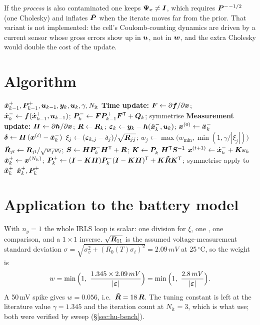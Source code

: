 If the \emph{process} is also contaminated one keeps $\bm\Psi_x\ne\bm{I}$, which requires
$\bm{P}^{-}{}^{-1/2}$ (one Cholesky) and inflates $\tilde{\bm{P}}$ when the iterate moves far from the
prior.  That variant is not implemented: the cell's Coulomb-counting dynamics are driven by a
current sensor whose gross errors show up in $\bm{u}$, not in $\bm{w}$, and the extra Cholesky would
double the cost of the update.

\section{Algorithm}
\begin{algorithm}[H]
\caption{Huber-EKF --- one sampling period}
\begin{algorithmic}[1]
\Require $\hat{\bm{x}}^{+}_{k-1},\bm{P}^{+}_{k-1},\bm{u}_{k-1},\bm{y}_k,\bm{u}_k,\gamma,N_{\mathrm{it}}$
\State \textbf{Time update:} $\bm{F}\gets\partial\bm{f}/\partial\bm{x}$;\;
  $\hat{\bm{x}}^{-}_k\gets\bm{f}(\hat{\bm{x}}^{+}_{k-1},\bm{u}_{k-1})$;\;
  $\bm{P}^{-}_k\gets\bm{F}\bm{P}^{+}_{k-1}\bm{F}^{\mathsf{T}}+\bm{Q}_k$; symmetrise
\State \textbf{Measurement update:} $\bm{H}\gets\partial\bm{h}/\partial\bm{x}$;\; $\bm{R}\gets\bm{R}_k$;\;
  $\bm{\varepsilon}_k\gets\bm{y}_k-\bm{h}(\hat{\bm{x}}^{-}_k,\bm{u}_k)$;\; $\bm{x}^{(0)}\gets\hat{\bm{x}}^{-}_k$
 
  \State $\bm\delta \gets \bm{H}\,(\bm{x}^{(t)}-\hat{\bm{x}}^{-}_k)$
    \State $\xi_j\gets(\bm{\varepsilon}_{k,j}-\delta_j)/\sqrt{\bm{R}_{jj}}$;\quad
           $w_j\gets\max\!\big(w_{\min},\min(1,\gamma/|\xi_j|)\big)$
  \EndFor
  \State $\tilde{\bm{R}}_{jl}\gets \bm{R}_{jl}/\sqrt{w_jw_l}$;\quad
         $\bm{S}\gets\bm{H}\bm{P}^{-}_k\bm{H}^{\mathsf{T}}+\tilde{\bm{R}}$;\quad
         $\bm{K}\gets\bm{P}^{-}_k\bm{H}^{\mathsf{T}}\bm{S}^{-1}$
  \State $\bm{x}^{(t+1)}\gets\hat{\bm{x}}^{-}_k+\bm{K}\bm{\varepsilon}_k$
\EndFor
\State $\hat{\bm{x}}^{+}_k\gets\bm{x}^{(N_{\mathrm{it}})}$;\quad
  $\bm{P}^{+}_k\gets(\bm{I}-\bm{K}\bm{H})\bm{P}^{-}_k(\bm{I}-\bm{K}\bm{H})^{\mathsf{T}}+\bm{K}\tilde{\bm{R}}\bm{K}^{\mathsf{T}}$; symmetrise
\State apply  to $\hat{\bm{x}}^{+}_k$
\Ensure $\hat{\bm{x}}^{+}_k,\bm{P}^{+}_k$
\end{algorithmic}
\end{algorithm}

\section{Application to the battery model}
With $n_y=1$ the whole IRLS loop is scalar: one division for $\xi$, one , one
comparison, and a $1\times1$ inverse.  $\sqrt{\bm{R}_{11}}$ is the assumed voltage-measurement
standard deviation
$\sigma=\sqrt{\sigma_v^2+(R_0(T)\sigma_i)^2}=2.09\,mV$ at 25\,\ensuremath{{}^\circ}C, so the
weight is
\begin{equation}
w = \min\Big(1,\ \frac{1.345\times2.09\,mV}{|\veps|}\Big)
  = \min\Big(1,\ \frac{2.8\,mV}{|\veps|}\Big).
\label{eq:hu-batt}
\end{equation}
A 50\,mV spike gives $w=0.056$, i.e.\ $\tilde{\bm{R}}=18\,\bm{R}$.  The tuning constant is
left at the literature value $\gamma=1.345$ and the iteration count at
$N_{\mathrm{it}}=3$, which is what \cite{karlgaard2007huber} use; both were verified by sweep
(\S\ref{sec:hu-bench}).

